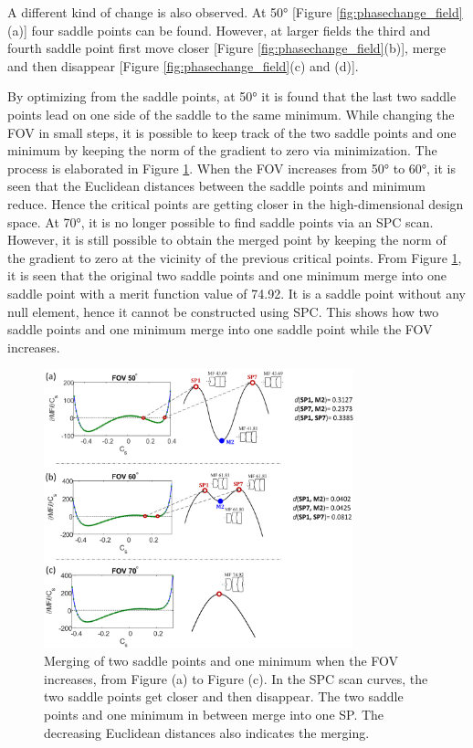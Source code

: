 A different kind of change is also observed. At 50° [Figure \ref{fig:phasechange_field}(a)] four saddle points can be found. However, at larger fields the third and fourth saddle point first move closer [Figure \ref{fig:phasechange_field}(b)], merge and then disappear [Figure \ref{fig:phasechange_field}(c) and (d)]. 

By optimizing from the saddle points, at 50° it is found that the last two saddle points lead on one side of the saddle to the same minimum. While changing the FOV in small steps, it is possible to keep track of the two saddle points and one minimum by keeping the norm of the gradient to zero via minimization. The process is elaborated in Figure \ref{fig:systemdie}. When the FOV increases from 50° to 60°, it is seen that the Euclidean distances between the saddle points and minimum reduce. Hence the critical points are getting closer in the high-dimensional design space. At 70°, it is no longer possible to find saddle points via an SPC scan. However, it is still possible to obtain the merged point by keeping the norm of the gradient to zero at the vicinity of the previous critical points. From Figure \ref{fig:systemdie}, it is seen that the original two saddle points and one minimum merge into one saddle point with a merit function value of 74.92. It is a saddle point without any null element, hence it cannot be constructed using SPC. This shows how two saddle points and one minimum merge into one saddle point while the FOV increases. 

\begin{figure}[h!]
    \centering
    \includegraphics[width=0.8\textwidth]{chapter-3/figures/SystemDie.png}
    \caption{Merging of two saddle points and one minimum when the FOV increases, from Figure (a) to Figure (c). In the SPC scan curves, the two saddle points get closer and then disappear. The two saddle points and one minimum in between merge into one SP. The decreasing Euclidean distances also indicates the merging.}
    \label{fig:systemdie}
\end{figure}

